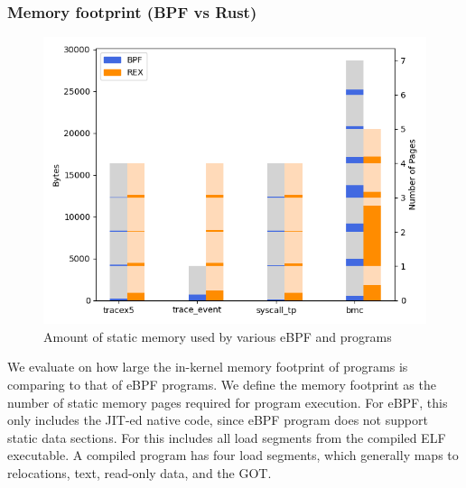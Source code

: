 \subsubsection{Memory footprint (BPF vs Rust)}
\begin{figure}
    \includegraphics[width=1.0\linewidth]{figs/mem-footprint.png}
    \centering
    \vspace{-25pt}
    \caption{Amount of static memory used by various eBPF and \projname{}
        programs }
    \label{fig:eval-mem-footprint}
    \vspace{-10pt}
\end{figure}
We evaluate on how large the in-kernel memory footprint of \projname{} programs
    is comparing to that of eBPF programs.
We define the memory footprint as the number of static memory pages required
    for program execution.
For eBPF, this only includes the JIT-ed native code, since eBPF program does
    not support static data sections.
For \projname{} this includes all load segments from the compiled ELF
    executable.
A compiled \projname{} program has four load segments, which generally maps to
    relocations, text, read-only data, and the GOT.

